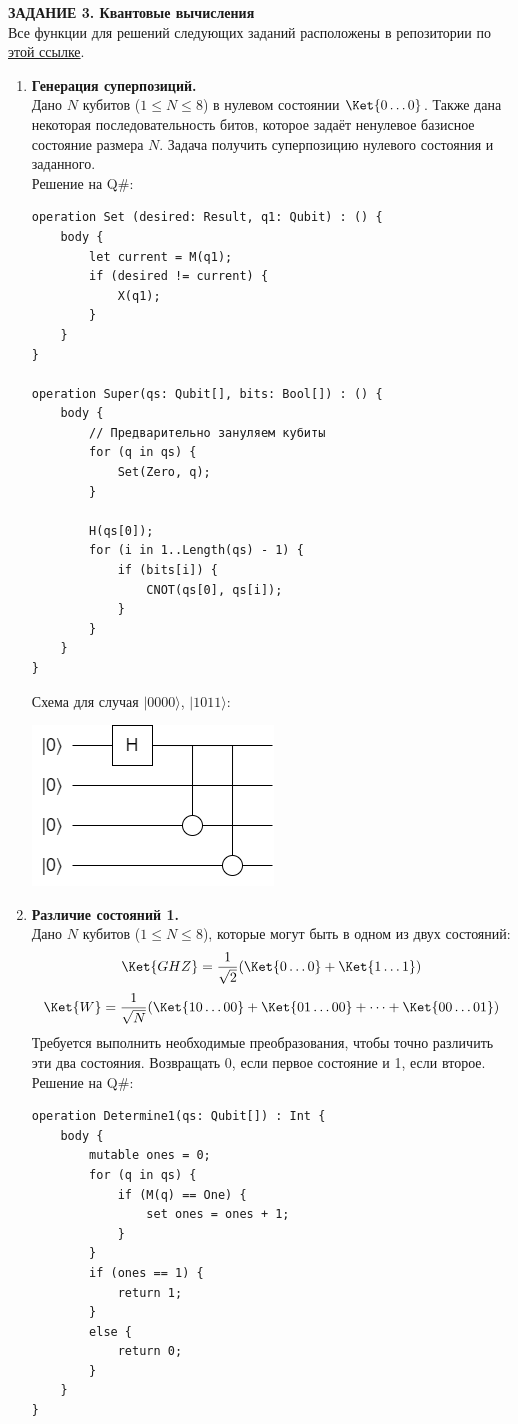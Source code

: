 \documentclass{article}
\begin{document}
        \textbf{ЗАДАНИЕ 3. Квантовые вычисления}\\ 
    Все функции для решений следующих заданий расположены в репозитории по \href{https://github.com/NRU-MPEI-IMAI/tm-and-qc-IliaTrofimov/blob/main/task-3.qs}{этой ссылке}.
    \begin{enumerate}
        \item \textbf{Генерация суперпозиций.}\\
        Дано $N$ кубитов ($1 \le N \le 8$) в нулевом состоянии $\Ket{0\dots0}$. Также дана некоторая последовательность битов, которое задаёт ненулевое базисное состояние размера $N$. Задача получить суперпозицию нулевого состояния и заданного.\\
        Решение на Q\#: \begin{verbatim}
operation Set (desired: Result, q1: Qubit) : () {
    body {
        let current = M(q1);
        if (desired != current) { 
            X(q1);
        }
    }
}

operation Super(qs: Qubit[], bits: Bool[]) : () {
    body {   
        // Предварительно зануляем кубиты
        for (q in qs) {
            Set(Zero, q);
        }
        
        H(qs[0]);
        for (i in 1..Length(qs) - 1) {
            if (bits[i]) {
                CNOT(qs[0], qs[i]); 
            } 
        }                  
    }
}
        \end{verbatim}
        Схема для случая \(|0 0 0 0 \rangle\), \(|1 0 1 1 \rangle\): 
        \begin{center}
            \includegraphics[scale=0.5]{1.png}
        \end{center}
        
        \item \textbf{Различие состояний 1.}\\
        Дано $N$ кубитов ($1 \le N \le 8$), которые могут быть в одном из двух состояний:
        $$\Ket{GHZ} = \frac{1}{\sqrt2}(\Ket{0\dots0} +\Ket{1\dots1})$$
        $$\Ket{W} = \frac{1}{\sqrt N}(\Ket{10\dots00}+\Ket{01\dots00} + \dots +\Ket{00\dots01})$$
        Требуется выполнить необходимые преобразования, чтобы точно различить эти два состояния. Возвращать $0$, если первое состояние и 1, если второе.\\
        Решение на Q\#: \begin{verbatim}
operation Determine1(qs: Qubit[]) : Int {
    body {   
        mutable ones = 0;
        for (q in qs) {
            if (M(q) == One) { 
                set ones = ones + 1; 
            }
        }
        if (ones == 1) {
            return 1;
        } 
        else {
            return 0;
        }                
    }
}
        \end{verbatim}
        

\end{enumerate}
\end{document}

